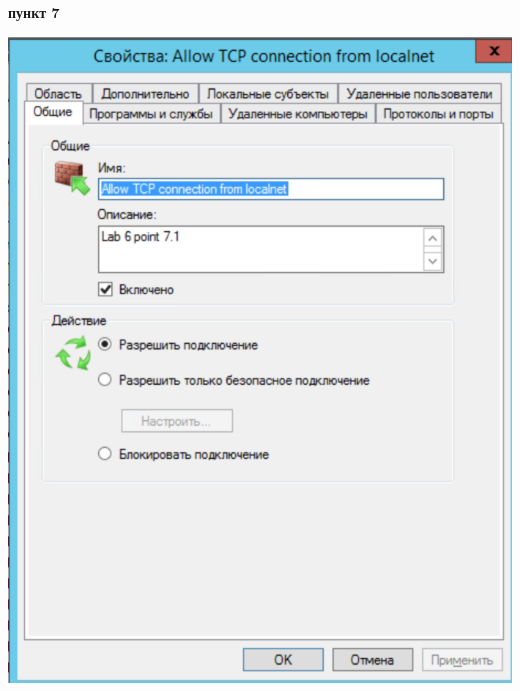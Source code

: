 \documentclass[a4paper,14pt]{extarticle}
\begin{document}
    \newpage
    \textbf{пункт 7}
    \begin{center}
        \includegraphics[scale=0.7]{7.1.1.png}
    \end{center}
\end{document}
